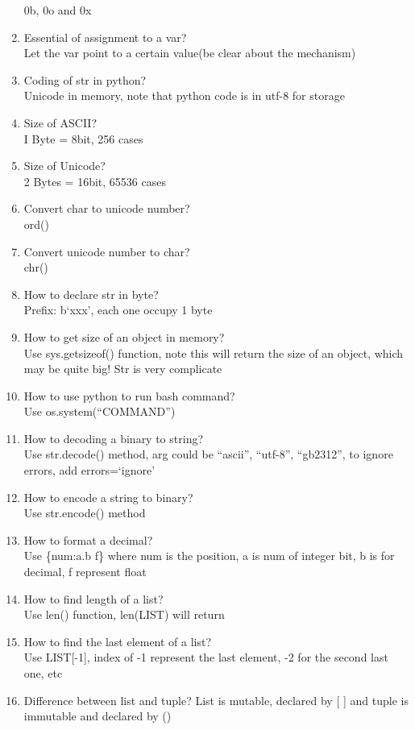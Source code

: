 \documentclass[10pt,a4paper,oneside]{article}
\begin{document}
\begin{enumerate}[1.]
 0b, 0o and 0x
 \item Essential of assignment to a var?\\
 Let the var point to a certain value(be clear about the mechanism)
 \item Coding of str in python?\\
 Unicode in memory, note that python code is in utf-8 for storage
 \item Size of ASCII?\\
 I Byte = 8bit, 256 cases
 \item Size of Unicode?\\
 2 Bytes = 16bit, 65536 cases
 \item Convert char to unicode number?\\
 ord()
 \item Convert unicode number to char?\\
 chr()
 \item How to declare str in byte?\\
 Prefix:  b`xxx', each one occupy 1 byte
 \item How to get size of an object in memory?\\
 Use sys.getsizeof() function, note this will return the size of an object, which may be quite big! Str is very complicate
 \item How to use python to run bash command?\\
 Use os.system(“COMMAND”)
 \item How to decoding a binary to string?\\
 Use str.decode() method, arg could be ``ascii'', ``utf-8'', ``gb2312'', to ignore errors, add errors=`ignore'
 \item How to encode a string to binary?\\
 Use str.encode() method
 \item How to format a decimal?\\
 Use \{num:a.b f\} where num is the position, a is num of integer bit, b is for decimal, f represent float
 \item How to find length of a list?\\
 Use len() function, len(LIST) will return
 \item How to find the last element of a list?\\
 Use LIST[-1], index of -1 represent the last element, -2 for the second last one, etc
 \item Difference between list and tuple?
 List is mutable, declared by [ ] and tuple is immutable and declared by ()

\end{enumerate}
\end{document}

